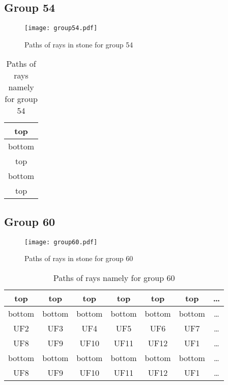 \subsection*{Group 54}






\begin{figure}[h!]
\centering
\texttt{[image: group54.pdf]}
\caption{Paths of rays in stone for group 54}
\label{table:FigGroup54}
\end{figure}



\begin{table}[h!]
\centering
\begin{tabular}{|c|}
\hline
top \\
\hline
bottom \\
\hline
top \\
\hline
bottom \\
\hline
top \\
\hline
\end{tabular}
\caption{Paths of rays namely for group 54}
\label{table:TableGroup54}
\end{table}
\newpage
\subsection*{Group 60}






\begin{figure}[h!]
\centering
\texttt{[image: group60.pdf]}
\caption{Paths of rays in stone for group 60}
\label{table:FigGroup60}
\end{figure}



\begin{table}[h!]
\centering
\begin{tabular}{|c|c|c|c|c|c|c|}
\hline
top & top & top & top & top & top & \dots \\
\hline
bottom & bottom & bottom & bottom & bottom & bottom & \dots \\
\hline
UF2 & UF3 & UF4 & UF5 & UF6 & UF7 & \dots \\
\hline
UF8 & UF9 & UF10 & UF11 & UF12 & UF1 & \dots \\
\hline
bottom & bottom & bottom & bottom & bottom & bottom & \dots \\
\hline
UF8 & UF9 & UF10 & UF11 & UF12 & UF1 & \dots \\
\hline
\end{tabular}
\caption{Paths of rays namely for group 60}
\label{table:TableGroup60}
\end{table}
\newpage
